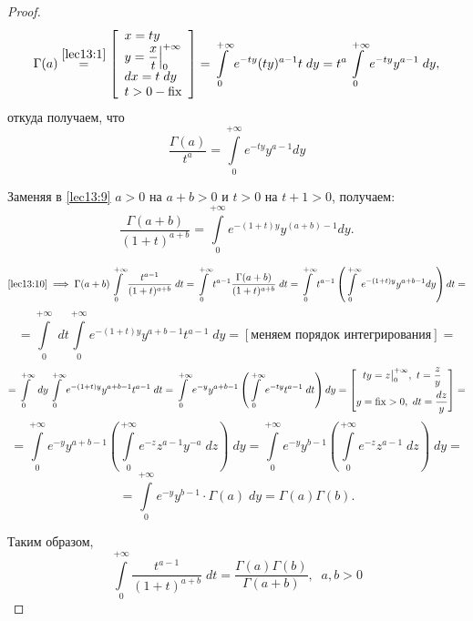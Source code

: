 \documentclass[../../main.tex]{subfiles}
\begin{document}
\begin{proof}
\[\Gamma(a) \stk{lec13:1}= \left[
\begin{array}{l}
  x=ty \\
  y = \dfrac{x}{t}\Big|^{+\infty}_0 \\
  dx = t\; dy \\
  t > 0 - \fix
\end{array}\right] = 
\int\limits_0^{+\infty}e^{-ty}(ty)^{a-1}t\;dy = t^a 
\int\limits_0^{+\infty}e^{-ty}y^{a-1}\;dy,\]
откуда получаем, что
\begin{equation}
  \label{lec13:9}
  \dfrac{\Gamma(a)}{t^a}=\int\limits_0^{+\infty}e^{-ty}y^{a-1}dy
\end{equation}

Заменяя в \eqref{lec13:9} $a > 0$ на $a+b > 0$ и $t > 0$ на $t+1 > 0$, 
получаем:
\begin{equation}
\label{lec13:10}
\dfrac{\Gamma(a+b)}{(1+t)^{a+b}} = \int\limits_0^{+\infty} e^{-(1+t)y} 
y^{(a+b) - 
1} dy.
\end{equation}

\[ \eqref{lec13:10} \implies \Gamma (a+b) \int\limits_{0}^{+\infty} \frac{ 
t^{a-1} }{ (1+t)^{a+b} } \; dt =
\int\limits_{0}^{+\infty} t^{a-1} \frac{\Gamma(a + b)}{(1+t)^{a+b}} \; dt = 
\int\limits_{0}^{+\infty} t^{a-1} \left(  
\int\limits_{0}^{+\infty} e^{-(1+t)y } y^{a+b-1} dy \right) dt = \]
\[ =
\int\limits_{0}^{+\infty} \; dt  \int\limits_{0}^{+\infty} e^{ -(1+t)y } 
y^{a+b-1}  t^{a-1} \; dy = 
[\text{меняем порядок интегрирования}]
= \]\[ =
\int\limits_{0}^{+\infty} \; dy \int\limits_{0}^{+\infty} e^{ -(1+t)y } 
y^{a+b-1} t^{a-1} \; dt  = \int\limits_{0}^{+\infty} e^{-y} y^{a+b-1} \left( 
\int\limits_{0}^{+\infty} e^{-ty} t^{a-1} \; dt \right) dy = \left[  
\begin{gathered}
ty = z \big|_{0}^{+\infty}, \ t = \frac{z}{y}\\
y = \operatorname{fix} > 0, \ dt = \frac{dz}{y} 
\end{gathered} \right] =   \]
\[ = \int\limits_{0}^{+\infty} e^{-y} y^{a+b-1} \left( 
\int\limits_{0}^{+\infty} e^{-z} z^{a-1} y^{-a}  \; dz   \right) \; dy = 
\int\limits_{0}^{+\infty} e^{-y} y^{b-1} \left( \int\limits_{0}^{+\infty} 
e^{-z} z^{a-1}  \; dz \right) \; dy  =  \]
\[ = \int\limits_{0}^{+\infty} e^{-y} y^{b-1}\cdot \Gamma(a) \; dy = \Gamma(a) 
\Gamma(b).  \]

Таким образом,
\begin{equation}
	\label{14:11}
	\int\limits_{0}^{+\infty} \frac{ t^{a-1} }{ (1+t)^{a+b} } \; dt = 
	\frac{\Gamma(a) \Gamma(b)}{\Gamma(a+b)}, \;\; a,b > 0
\end{equation}


\end{proof}
\end{document}

